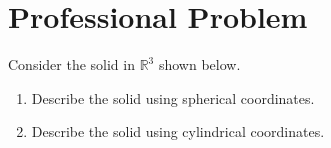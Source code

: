 \documentclass{ximera}
\begin{document}
\section{Professional Problem}

\begin{problem}
Consider the solid in $\mathbb{R}^3$ shown below.

\begin{image}
\end{image}

\begin{enumerate}
\item Describe the solid using spherical coordinates.
\item Describe the solid using cylindrical coordinates.
\end{enumerate}


\end{problem}
\end{document}
